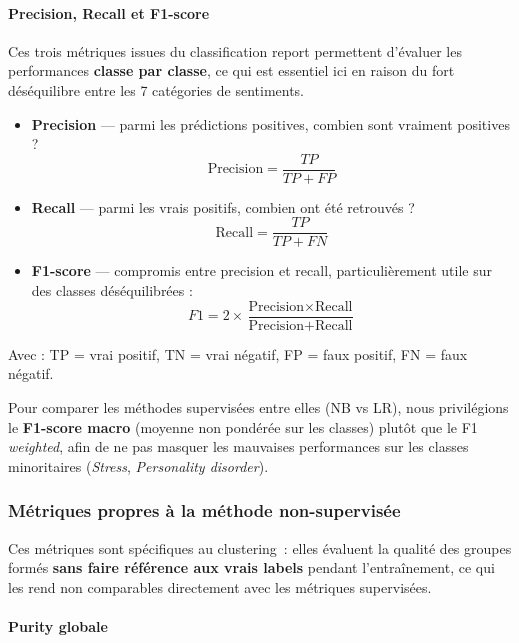 \documentclass[12pt,a4paper]{report}
\begin{document}
\paragraph{Precision, Recall et F1-score}

Ces trois métriques issues du classification report permettent d'évaluer les performances \textbf{classe par classe}, ce qui est essentiel ici en raison du fort déséquilibre entre les 7 catégories de sentiments.

\begin{itemize}
  \item \textbf{Precision} --- parmi les prédictions positives, combien sont vraiment positives ?
  \[
    \text{Precision} = \frac{TP}{TP + FP}
  \]
  \item \textbf{Recall} --- parmi les vrais positifs, combien ont été retrouvés ?
  \[
    \text{Recall} = \frac{TP}{TP + FN}
  \]
  \item \textbf{F1-score} --- compromis entre precision et recall, particulièrement utile sur des classes déséquilibrées :
  \[
    F1 = 2 \times \frac{\text{Precision} \times \text{Recall}}{\text{Precision} + \text{Recall}}
  \]
\end{itemize}

Avec : TP = vrai positif, TN = vrai négatif, FP = faux positif, FN = faux négatif.

\begin{note}[Remarque]
Pour comparer les méthodes supervisées entre elles (NB vs LR), nous privilégions le \textbf{F1-score macro} (moyenne non pondérée sur les classes) plutôt que le F1 \textit{weighted}, afin de ne pas masquer les mauvaises performances sur les classes minoritaires (\textit{Stress}, \textit{Personality disorder}).
\end{note}

\subsubsection{Métriques propres à la méthode non-supervisée}

Ces métriques sont spécifiques au clustering~: elles évaluent la qualité des groupes formés \textbf{sans faire référence aux vrais labels} pendant l'entraînement, ce qui les rend non comparables directement avec les métriques supervisées.

\paragraph{Purity globale}
\end{document}
